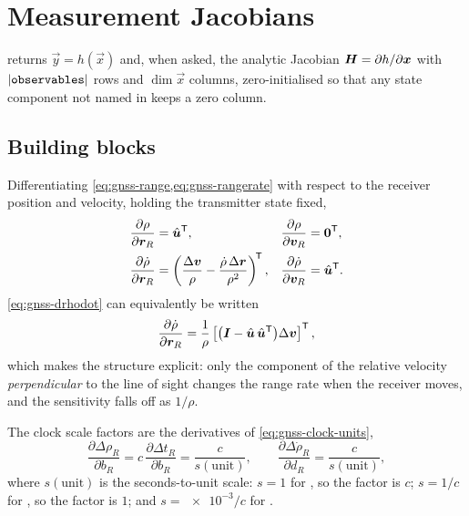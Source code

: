 \section{Measurement Jacobians}
\label{sec:gnss-jacobian}

 returns $\vec{y} = h(\vec{x})$ and, when
asked, the analytic Jacobian $\bm{H} = \partial h/\partial\bm{x}$ with
$|\texttt{observables}|$ rows and $\dim\vec{x}$ columns, zero-initialised so
that any state component not named in  keeps a zero column.

\subsection{Building blocks}

Differentiating \cref{eq:gnss-range,eq:gnss-rangerate} with respect to the
receiver position and velocity, holding the transmitter state fixed,
\begin{align}
  \label{eq:gnss-drho}
  \frac{\partial \rho}{\partial \bm{r}_R} &= \hat{\bm{u}}^{\mathsf{T}},
  &
  \frac{\partial \rho}{\partial \bm{v}_R} &= \bm{0}^{\mathsf{T}}, \\
  \label{eq:gnss-drhodot}
  \frac{\partial \dot\rho}{\partial \bm{r}_R}
    &= \left( \frac{\Delta\bm{v}}{\rho}
       - \frac{\dot\rho\,\Delta\bm{r}}{\rho^{2}} \right)^{\!\mathsf{T}},
  &
  \frac{\partial \dot\rho}{\partial \bm{v}_R} &= \hat{\bm{u}}^{\mathsf{T}} .
\end{align}
\cref{eq:gnss-drhodot} can equivalently be written
\begin{equation}
  \label{eq:gnss-drhodot-proj}
  \frac{\partial \dot\rho}{\partial \bm{r}_R}
  = \frac{1}{\rho}
    \left[ \bigl( \bm{I} - \hat{\bm{u}}\,\hat{\bm{u}}^{\mathsf{T}} \bigr) \Delta\bm{v}
    \right]^{\mathsf{T}},
\end{equation}
which makes the structure explicit: only the component of the relative
velocity \emph{perpendicular} to the line of sight changes the range rate when
the receiver moves, and the sensitivity falls off as $1/\rho$.

The clock scale factors are the derivatives of \cref{eq:gnss-clock-units},
\begin{equation}
  \label{eq:gnss-clock-deriv}
  \frac{\partial \Delta\rho_R}{\partial b_R}
    = c\,\frac{\partial \Delta t_R}{\partial b_R}
    = \frac{c}{s(\text{unit})},
  \qquad
  \frac{\partial \Delta\dot\rho_R}{\partial d_R}
    = \frac{c}{s(\text{unit})},
\end{equation}
where $s(\text{unit})$ is the seconds-to-unit scale: $s = 1$ for
, so the factor is $c$; $s = 1/c$ for , so the
factor is $1$; and $s = \num{e-3}/c$ for .

